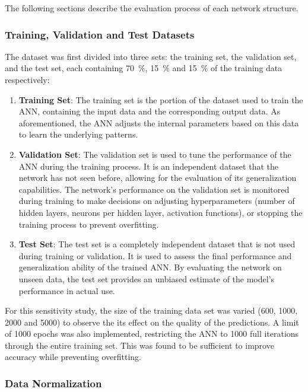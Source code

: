 The following sections describe the evaluation process of each network structure.

\subsubsection{Training, Validation and Test Datasets}

The dataset was first divided into three sets: the training set, the validation set, and the test set, each containing 70~$\%$, 15~$\%$ and 15~$\%$ of the training data respectively:

\begin{enumerate}
	\item \textbf{Training Set}: The training set is the portion of the dataset used to train the ANN, containing the input data and the corresponding output data. As aforementioned, the ANN adjusts the internal parameters based on this data to learn the underlying patterns.
	\item \textbf{Validation Set}: The validation set is used to tune the performance of the ANN during the training process. It is an independent dataset that the network has not seen before, allowing for the evaluation of its generalization capabilities. The network's performance on the validation set is monitored during training to make decisions on adjusting hyperparameters (number of hidden layers, neurons per hidden layer, activation functions), or stopping the training process to prevent overfitting.
	\item \textbf{Test Set}: The test set is a completely independent dataset that is not used during training or validation. It is used to assess the final performance and generalization ability of the trained ANN. By evaluating the network on unseen data, the test set provides an unbiased estimate of the model's performance in actual use.
\end{enumerate}

For this sensitivity study, the size of the training data set was varied (600, 1000, 2000 and 5000) to observe the its effect on the quality of the predictions. A limit of 1000 epochs was also implemented, restricting the ANN to 1000 full iterations through the entire training set. This was found to be sufficient to improve accuracy while preventing overfitting.

\subsubsection{Data Normalization}

